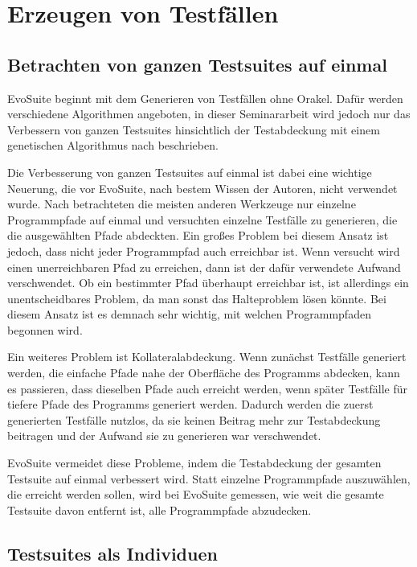 \documentclass[a4paper,11pt]{article}
\begin{document}
\section{Erzeugen von Testfällen}
\label{sec:erzeugen_von_testfaellen}

\subsection{Betrachten von ganzen Testsuites auf einmal}

EvoSuite beginnt mit dem Generieren von Testfällen ohne Orakel.
Dafür werden verschiedene Algorithmen angeboten, in dieser Seminararbeit wird jedoch nur das Verbessern von ganzen Testsuites hinsichtlich der Testabdeckung mit einem genetischen Algorithmus nach \cite{TSE12_EvoSuite} beschrieben.

Die Verbesserung von ganzen Testsuites auf einmal ist dabei eine wichtige Neuerung, die vor EvoSuite, nach bestem Wissen der Autoren, nicht verwendet wurde.
Nach \cite{TSE12_EvoSuite} betrachteten die meisten anderen Werkzeuge nur einzelne Programmpfade auf einmal und versuchten einzelne Testfälle zu generieren, die die ausgewählten Pfade abdeckten.
Ein großes Problem bei diesem Ansatz ist jedoch, dass nicht jeder Programmpfad auch erreichbar ist.
Wenn versucht wird einen unerreichbaren Pfad zu erreichen, dann ist der dafür verwendete Aufwand verschwendet.
Ob ein bestimmter Pfad überhaupt erreichbar ist, ist allerdings ein unentscheidbares Problem, da man sonst das Halteproblem lösen könnte.
Bei diesem Ansatz ist es demnach sehr wichtig, mit welchen Programmpfaden begonnen wird.

Ein weiteres Problem ist Kollateralabdeckung.
Wenn zunächst Testfälle generiert werden, die einfache Pfade nahe der Oberfläche des Programms abdecken, kann es passieren, dass dieselben Pfade auch erreicht werden, wenn später Testfälle für tiefere Pfade des Programms generiert werden.
Dadurch werden die zuerst generierten Testfälle nutzlos, da sie keinen Beitrag mehr zur Testabdeckung beitragen und der Aufwand sie zu generieren war verschwendet.

EvoSuite vermeidet diese Probleme, indem die Testabdeckung der gesamten Testsuite auf einmal verbessert wird.
Statt einzelne Programmpfade auszuwählen, die erreicht werden sollen, wird bei EvoSuite gemessen, wie weit die gesamte Testsuite davon entfernt ist, alle Programmpfade abzudecken.

\subsection{Testsuites als Individuen}
\end{document}
